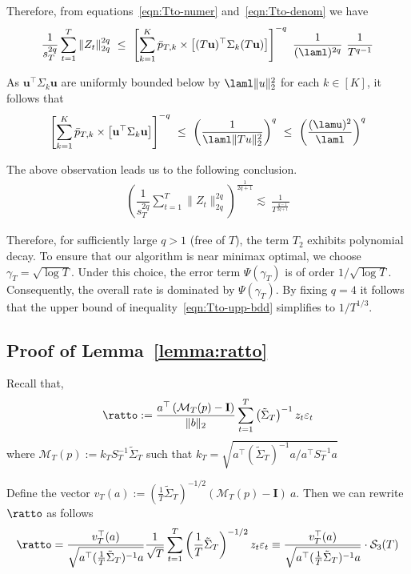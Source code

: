 \documentclass[11pt,letterpaper]{article}
\newcommand{\Id}{\mathbf{I}}
\newcommand{\z}{z}
\newcommand{\err}{\Psi(\gamma_T)}
\newcommand{\PT}{\tilde{\Sigma}_T}
\newcommand{\SigPinv}{ \left(\PT \right)^{-1}}
\newcommand{\mtp}{S_T^{-1} \PT}
\newcommand{\MTP}{\mathcal{M}_T(p)}
\newcommand{\lvec}{\textbf{u}}
\theoremstyle{plain}
\theoremstyle{definition}  %
\begin{document}
\noindent Therefore, from equations~\eqref{eqn:Tto-numer} and~\eqref{eqn:Tto-denom} we have
\begin{align*}
    \frac{1}{s_T^{2q}}\sum^T_{t=1} \| Z_t\|^{2q}_{2q}
    \ \leq \ \left[ \sum^K_{k=1} \bar{p}_{T,k} \times \left[  (T\lvec)^{\top} \Sigma_k (T\lvec) \right] \right]^{-q} \ \frac{1}{(\laml)^{2q}} \ \frac{1}{T^{q-1}}
\end{align*}

\noindent As $\lvec^{\top} \Sigma_k \lvec$ are uniformly bounded below by $\laml \|u\|^2_2$ for each 
$k \in [K]$, it follows that
\begin{align*}
    \left[ \sum^K_{k=1} \bar{p}_{T,k} \times \left[  \lvec^{\top} \Sigma_k \lvec \right] \right]^{-q} \ \leq \ \left(\frac{1}{\laml \|Tu\|^2_2} \right)^q
    \ \leq \ \left(\frac{(\lamu)^2}{\laml} \right)^q
\end{align*}

\noindent The above  observation leads us to the following conclusion.
\begin{align}\label{eqn:Tto-upp-bdd}
    \left(\dfrac{1}{s^{2q}_T}\sum^T_{t=1} \| Z_t\|^{2q}_{2q} \right)^{\frac{1}{2q+1}} \lesssim  \ \frac{1}{T^{\frac{q-1}{2q+1}} } 
\end{align}

\noindent Therefore, for sufficiently large $q>1$ (free of $T$), the term $T_2$ exhibits polynomial decay. To ensure that our algorithm is near minimax optimal, we choose $\gamma_T = \sqrt{\log T}$. Under this choice, the error term $\err$ is of order $1/\sqrt{\log T}$. Consequently, the overall rate is dominated by $\err$. By fixing $q = 4$ it follows that the upper bound of inequality~\eqref{eqn:Tto-upp-bdd} simplifies to $1/T^{1/3}$.


\subsection*{Proof of Lemma~\ref{lemma:ratto}}

\newcommand{\stath}{\mathcal{S}_3(T)}

\noindent Recall that,
\begin{align*}
    \ratto :=  \frac{a^{\top} \left(\MTP-\Id  \right)}{ \| b\|_2} \sum^T_{t=1} \SigPinv\z_t  \varepsilon_t
\end{align*}
where $\MTP := k_T \mtp$ such that $ k_T = \sqrt{ a^{\top} \SigPinv a / a^{\top} S_T^{-1} a}  
$

 
\noindent Define the vector $v_T(a) :=  (\frac{1}{T}\PT)^{-1/2} \left(\MTP-\Id  \right)\ a $. Then we can rewrite $\ratto$ as follows
\begin{align*}
    \ratto = \frac{v_T^\top (a)}{  \sqrt{a^\top (\frac{1}{T}\PT)^{-1}  a}} \frac{1}{\sqrt{T}}\sum^T_{t=1} \left(\frac{1}{T}\PT \right)^{-1/2} \z_t  \varepsilon_t \equiv \frac{v_T^\top (a)}{  \sqrt{a^\top (\frac{1}{T}\PT)^{-1}  a}} \cdot \stath
\end{align*}
\end{document}
